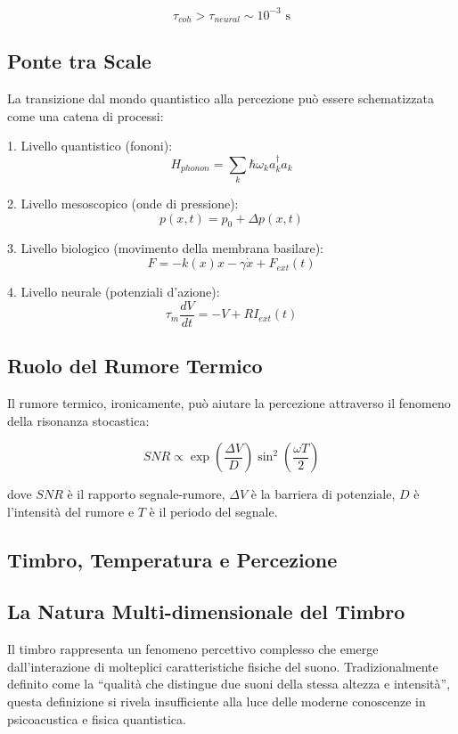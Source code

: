 \documentclass{gs-adonis}
\begin{document}
\[\tau_{coh} > \tau_{neural} \sim 10^{-3} \text{ s}\]

\subsection{Ponte tra Scale}\label{ponte-tra-scale}

La transizione dal mondo quantistico alla percezione può essere
schematizzata come una catena di processi:

1. Livello quantistico (fononi):
\[H_{phonon} = \sum_k \hbar\omega_k a_k^\dagger a_k\]

2. Livello mesoscopico (onde di pressione):
\[p(x,t) = p_0 + \Delta p(x,t)\]

3. Livello biologico (movimento della membrana basilare):
\[F = -k(x)x - \gamma\dot{x} + F_{ext}(t)\]

4. Livello neurale (potenziali d'azione):
\[\tau_m\frac{dV}{dt} = -V + RI_{ext}(t)\]

\subsection{Ruolo del Rumore Termico}\label{ruolo-del-rumore-termico}

Il rumore termico, ironicamente, può aiutare la percezione attraverso il
fenomeno della risonanza stocastica:

\[SNR \propto \exp\left(\frac{\Delta V}{D}\right)\sin^2\left(\frac{\omega T}{2}\right)\]

dove \(SNR\) è il rapporto segnale-rumore, \(\Delta V\) è la barriera di
potenziale, \(D\) è l'intensità del rumore e \(T\) è il periodo del
segnale.

\subsection{Timbro, Temperatura e
Percezione}\label{timbro-temperatura-e-percezione}

\subsection{La Natura Multi-dimensionale del
Timbro}\label{la-natura-multi-dimensionale-del-timbro}

Il timbro rappresenta un fenomeno percettivo complesso che emerge
dall'interazione di molteplici caratteristiche fisiche del suono.
Tradizionalmente definito come la ``qualità che distingue due suoni
della stessa altezza e intensità'', questa definizione si rivela
insufficiente alla luce delle moderne conoscenze in psicoacustica e
fisica quantistica.
\end{document}
